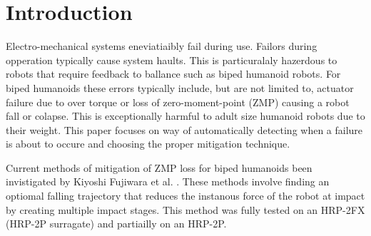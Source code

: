 \section{Introduction}
Electro-mechanical systems eneviatiaibly fail during use.  Failors during opperation typically cause system haults.  This is particuralaly hazerdous to robots that require feedback to ballance such as biped humanoid robots.  For biped humanoids these errors typically include, but are not limited to, actuator failure due to over torque or loss of zero-moment-point (ZMP) \cite{zmp35} causing a robot fall or colapse.  This is exceptionally harmful to adult size humanoid robots due to their weight.  This paper focuses on way of automatically detecting when a failure is about to occure and choosing the proper mitigation technique. 

Current methods of mitigation of ZMP loss for biped humanoids been invistigated by Kiyoshi Fujiwara et al. \cite{4115653,1248925}.  These methods involve finding an optiomal falling trajectory that reduces the instanous force of the robot at impact by creating multiple impact stages\cite{4399327}.  This method was fully tested on an HRP-2FX (HRP-2P surragate) and partiailly on an HRP-2P.